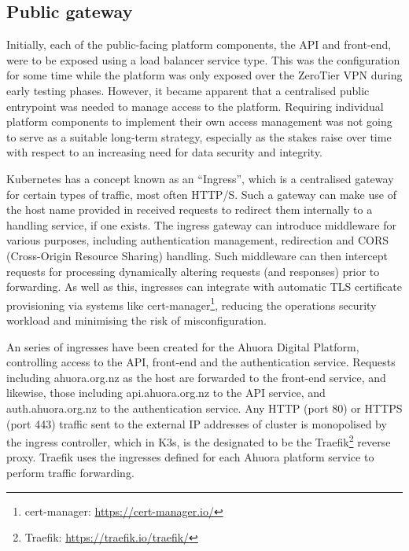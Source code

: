 \subsection{Public gateway}

Initially, each of the public-facing platform components, the API and front-end, were to be exposed using a load balancer service type. This was the configuration for some time while the platform was only exposed over the ZeroTier VPN during early testing phases. However, it became apparent that a centralised public entrypoint was needed to manage access to the platform. Requiring individual platform components to implement their own access management was not going to serve as a suitable long-term strategy, especially as the stakes raise over time with respect to an increasing need for data security and integrity.

Kubernetes has a concept known as an ``Ingress'', which is a centralised gateway for certain types of traffic, most often HTTP/S. Such a gateway can make use of the host name provided in received requests to redirect them internally to a handling service, if one exists. The ingress gateway can introduce middleware for various purposes, including authentication management, redirection and CORS (Cross-Origin Resource Sharing) handling. Such middleware can then intercept requests for processing dynamically altering requests (and responses) prior to forwarding. As well as this, ingresses can integrate with automatic TLS certificate provisioning via systems like cert-manager\footnote{cert-manager: \url{https://cert-manager.io/}}, reducing the operations security workload and minimising the risk of misconfiguration.

An series of ingresses have been created for the Ahuora Digital Platform, controlling access to the API, front-end and the authentication service. Requests including ahuora.org.nz as the host are forwarded to the front-end service, and likewise, those including api.ahuora.org.nz to the API service, and auth.ahuora.org.nz to the authentication service. Any HTTP (port 80) or HTTPS (port 443) traffic sent to the external IP addresses of cluster is monopolised by the ingress controller, which in K3s, is the designated to be the Traefik\footnote{Traefik: \url{https://traefik.io/traefik/}} reverse proxy. Traefik uses the ingresses defined for each Ahuora platform service to perform traffic forwarding.


